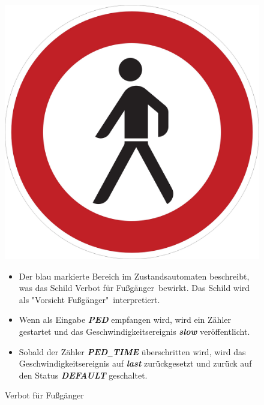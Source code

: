 \begin{figure}[h]
	\begin{minipage}[t]{4cm}
		\vspace{0pt}
		\centering
		\includegraphics[scale=0.07]{images/PED.jpg}
		\caption{Verbot f\"ur Fu\ss{}g\"anger}
		\label{fig:PED}
	\end{minipage}
	\hfill
	\begin{minipage}[t]{10cm}
		\vspace{0pt}
		\begin{itemize}
			\item Der blau markierte Bereich im Zustandsautomaten beschreibt, was das Schild \glqq Verbot f\"ur Fu\ss{}g\"anger\grqq \ bewirkt. Das Schild wird als "Vorsicht Fu\ss{}g\"anger"\  interpretiert.
			
			\item Wenn als Eingabe \textbf{\textit{PED}} empfangen wird, wird ein Z\"ahler gestartet und das Geschwindigkeitsereignis \textbf{\textit{slow}} ver\"offentlicht.
			
			\item Sobald der Z\"ahler \textbf{\textit{PED\underline{\ }TIME}} \"uberschritten wird, wird das Geschwindigkeitsereignis auf \textbf{\textit{last}} zur\"uckgesetzt und zur\"uck auf den Status \textbf{\textit{DEFAULT}} geschaltet.
		\end{itemize}
	\end{minipage}
\end{figure}


